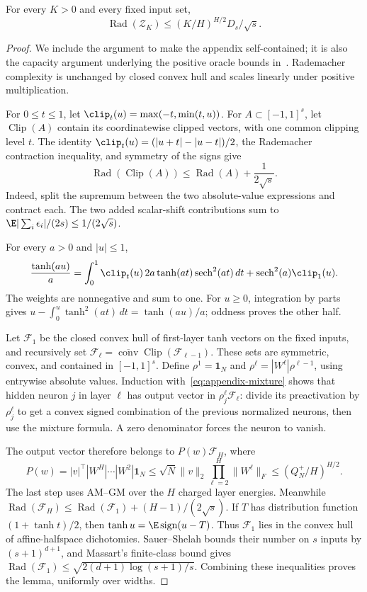 \begin{lemma}
\label{lem:appendix-capacity}
For every $K>0$ and every fixed input set,
\[
 \operatorname{Rad}(\mathcal Z_K)
       \le (K/H)^{H/2}D_s/\sqrt s.
\]
\end{lemma}
\begin{proof}
We include the argument to make the appendix self-contained; it is also the capacity argument underlying the positive oracle bounds in~\cite{sharper}. Rademacher complexity is unchanged by closed convex hull and scales linearly under positive multiplication.

For $0\le t\le1$, let $\clip_t(u)=\max(-t,\min(t,u))$. For $A\subset[-1,1]^s$, let $\operatorname{Clip}(A)$ contain its coordinatewise clipped vectors, with one common clipping level $t$. The identity $\clip_t(u)=(|u+t|-|u-t|)/2$, the Rademacher contraction inequality, and symmetry of the signs give
\[
 \operatorname{Rad}(\operatorname{Clip}(A))
       \le\operatorname{Rad}(A)+\frac1{2\sqrt s}.
\]
Indeed, split the supremum between the two absolute-value expressions and contract each. The two added scalar-shift contributions sum to
$\E|\sum_i\epsilon_i|/(2s)\le1/(2\sqrt s)$.

For every $a>0$ and $|u|\le1$,
\begin{equation}
 \frac{\tanh(au)}a=
 \int_0^1\clip_t(u)\,2a\tanh(at)\operatorname{sech}^2(at)\,dt
       +\operatorname{sech}^2(a)\clip_1(u).
 \label{eq:appendix-mixture}
\end{equation}
The weights are nonnegative and sum to one. For $u\ge0$, integration by parts gives $u-\int_0^u\tanh^2(at)\,dt=\tanh(au)/a$; oddness proves the other half.

Let $\mathcal F_1$ be the closed convex hull of first-layer tanh vectors on the fixed inputs, and recursively set
$\mathcal F_\ell=\overline{\operatorname{conv}}\operatorname{Clip}(\mathcal F_{\ell-1})$.
These sets are symmetric, convex, and contained in $[-1,1]^s$. Define
$\rho^1=\boldsymbol1_N$ and
$\rho^\ell=|W^\ell|\rho^{\ell-1}$, using entrywise absolute values.
Induction with~\eqref{eq:appendix-mixture} shows that hidden neuron $j$ in layer $\ell$ has output vector in $\rho^\ell_j\mathcal F_\ell$: divide its preactivation by $\rho^\ell_j$ to get a convex signed combination of the previous normalized neurons, then use the mixture formula. A zero denominator forces the neuron to vanish.

The output vector therefore belongs to $P(w)\mathcal F_H$, where
\[
 P(w)=|v|^\top|W^H|\cdots|W^2|\boldsymbol1_N
 \le\sqrt N\|v\|_2\prod_{\ell=2}^H\|W^\ell\|_F
 \le(Q_N^+/H)^{H/2}.
\]
The last step uses AM--GM over the $H$ charged layer energies. Meanwhile
$\operatorname{Rad}(\mathcal F_H)\le\operatorname{Rad}(\mathcal F_1)+(H-1)/(2\sqrt s)$.
If $T$ has distribution function $(1+\tanh t)/2$, then
$\tanh u=\E\operatorname{sign}(u-T)$. Thus $\mathcal F_1$ lies in the convex hull of affine-halfspace dichotomies. Sauer--Shelah bounds their number on $s$ inputs by $(s+1)^{d+1}$, and Massart's finite-class bound gives
$\operatorname{Rad}(\mathcal F_1)\le\sqrt{2(d+1)\log(s+1)/s}$.
Combining these inequalities proves the lemma, uniformly over widths.
\end{proof}

